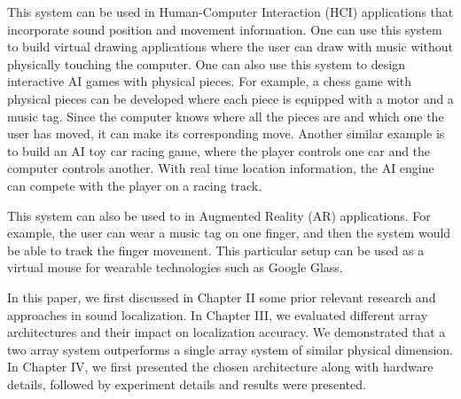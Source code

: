 This system can be used in Human-Computer Interaction (HCI) applications that incorporate sound position and movement information. One can use this system to build virtual drawing applications where the user can draw with music without physically touching the computer. One can also use this system to design interactive AI games with physical pieces. For example, a chess game with physical pieces can be developed where each piece is equipped with a motor and a music tag. Since the computer knows where all the pieces are and which one the user has moved, it can make its corresponding move. Another similar example is to build an AI toy car racing game, where the player controls one car and the computer controls another. With real time location information, the AI engine can compete with the player on a racing track. 

This system can also be used to in Augmented Reality (AR) applications. For example, the user can wear a music tag on one finger, and then the system would be able to track the finger movement. This particular setup can be used as a virtual mouse for wearable technologies such as Google Glass. 


In this paper, we first discussed in Chapter II some prior relevant research and approaches in sound localization. In Chapter III, we evaluated different array architectures and their impact on localization accuracy. We demonstrated that a two array system outperforms a single array system of similar physical dimension. In Chapter IV, we first presented the chosen architecture along with hardware details, followed by experiment details and results were presented. 

